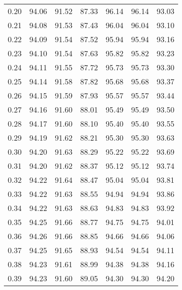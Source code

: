\begin{tabular}{|c|c|c|c|c|c|c|}
      0.20 &     94.06 &     91.52 &      87.33 &   96.14 &      96.14 &         93.03 \\
      0.21 &     94.08 &     91.53 &      87.43 &   96.04 &      96.04 &         93.10 \\
      0.22 &     94.09 &     91.54 &      87.52 &   95.94 &      95.94 &         93.16 \\
      0.23 &     94.10 &     91.54 &      87.63 &   95.82 &      95.82 &         93.23 \\
      0.24 &     94.11 &     91.55 &      87.72 &   95.73 &      95.73 &         93.30 \\
      0.25 &     94.14 &     91.58 &      87.82 &   95.68 &      95.68 &         93.37 \\
      0.26 &     94.15 &     91.59 &      87.93 &   95.57 &      95.57 &         93.44 \\
      0.27 &     94.16 &     91.60 &      88.01 &   95.49 &      95.49 &         93.50 \\
      0.28 &     94.17 &     91.60 &      88.10 &   95.40 &      95.40 &         93.55 \\
      0.29 &     94.19 &     91.62 &      88.21 &   95.30 &      95.30 &         93.63 \\
      0.30 &     94.20 &     91.63 &      88.29 &   95.22 &      95.22 &         93.69 \\
      0.31 &     94.20 &     91.62 &      88.37 &   95.12 &      95.12 &         93.74 \\
      0.32 &     94.22 &     91.64 &      88.47 &   95.04 &      95.04 &         93.81 \\
      0.33 &     94.22 &     91.63 &      88.55 &   94.94 &      94.94 &         93.86 \\
      0.34 &     94.22 &     91.63 &      88.63 &   94.83 &      94.83 &         93.92 \\
      0.35 &     94.25 &     91.66 &      88.77 &   94.75 &      94.75 &         94.01 \\
      0.36 &     94.26 &     91.66 &      88.85 &   94.66 &      94.66 &         94.06 \\
      0.37 &     94.25 &     91.65 &      88.93 &   94.54 &      94.54 &         94.11 \\
      0.38 &     94.23 &     91.61 &      88.99 &   94.38 &      94.38 &         94.16 \\
      0.39 &     94.23 &     91.60 &      89.05 &   94.30 &      94.30 &         94.20 \\

\end{tabular}
